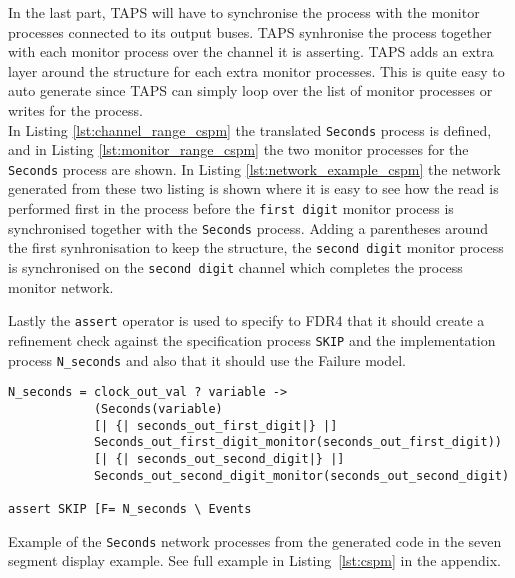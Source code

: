 In the last part, TAPS will have to synchronise the process with the monitor processes connected to its output buses.
TAPS synhronise the process together with each monitor process over the channel it is asserting.
TAPS adds an extra layer around the structure for each extra monitor processes.
This is quite easy to auto generate since TAPS can simply loop over the list of monitor processes or writes for the process. \\

In Listing \ref{lst:channel_range_cspm} the translated \texttt{Seconds} process is defined, and in Listing \ref{lst:monitor_range_cspm} the two monitor processes for the \texttt{Seconds} process are shown.
In Listing \ref{lst:network_example_cspm} the network generated from these two listing is shown where it is easy to see how the read is performed first in the process before the \texttt{first digit} monitor process is synchronised together with the \texttt{Seconds} process. Adding a parentheses around the first synhronisation to keep the structure, the \texttt{second digit} monitor process is synchronised on the \texttt{second digit} channel which completes the process monitor network.

Lastly the \texttt{assert} operator is used to specify to FDR4 that it should create a refinement check against the specification process \texttt{SKIP} and the implementation process \texttt{N\_seconds} and also that it should use the Failure model.\\
\begin{listing}
\begin{verbatim}
N_seconds = clock_out_val ? variable ->
            (Seconds(variable)
            [| {| seconds_out_first_digit|} |]
            Seconds_out_first_digit_monitor(seconds_out_first_digit))
            [| {| seconds_out_second_digit|} |]
            Seconds_out_second_digit_monitor(seconds_out_second_digit)

assert SKIP [F= N_seconds \ Events
\end{verbatim}
\caption{Example of the \texttt{Seconds} network processes from the generated \cspm{} code in the seven segment display example. See full example in Listing~\ref{lst:cspm} in the appendix.}
\label{lst:network_example_cspm}
\end{listing}

